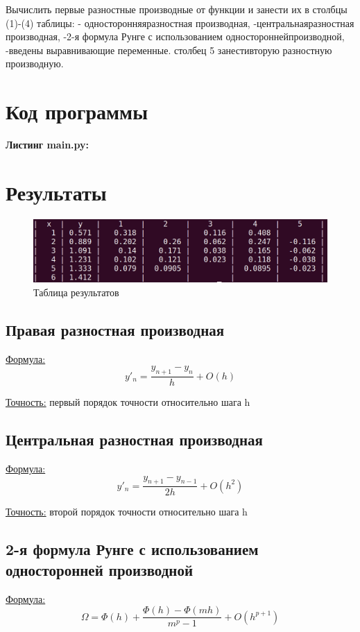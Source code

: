\documentclass[a4paper,12pt]{article}
\begin{document}
Вычислить первые разностные производные от функции и занести их в столбцы (1)-(4) таблицы:
 - односторонняяразностная производная,
 -центральнаяразностная производная,
-2-я формула Рунге с использованием одностороннейпроизводной,
 -введены выравнивающие переменные.
 столбец 5 занестивторую разностную производную.

\section{Код программы}
\noindent\textbf{Листинг main.py:}


\section{Результаты}
\begin{figure}[H]
    \centering
    \includegraphics[scale=0.4]{./screens/table.png}
    \caption{Таблица результатов}
    \label{fig:my_label}
\end{figure}

\subsection{Правая разностная производная}
\underline{Формула:}
\[y'_n = \frac{y_{n+1} - y_n}{h} + O(h)\]

\underline{Точность:} первый порядок точности относительно шага h

\subsection{Центральная разностная производная}
\underline{Формула:}
\[y'_n = \frac{y_{n+1} - y_{n-1}}{2h} + O(h^2)\]

\underline{Точность:} второй порядок точности относительно шага h

\subsection{2-я формула Рунге с использованием односторонней производной}
\underline{Формула:}
\[\Omega = \Phi(h) + \frac{\Phi(h) - \Phi(mh)}{m^p-1} + O(h^{p+1})\]
\end{document}
